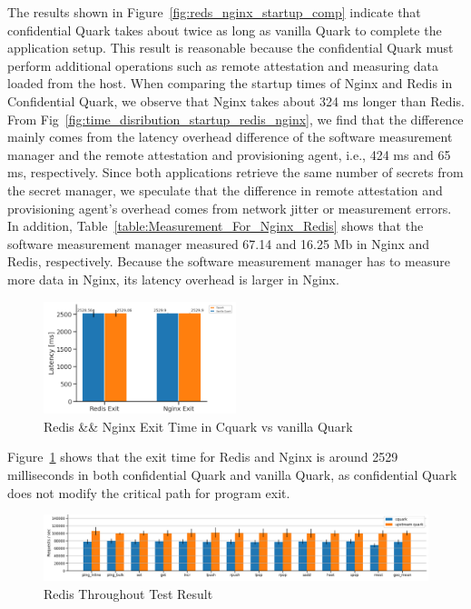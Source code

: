 The results shown in Figure~\ref{fig:reds_nginx_startup_comp} indicate that confidential Quark takes about twice as long as vanilla Quark to complete the application setup. This result is reasonable because the confidential Quark must perform additional operations such as remote attestation and 
measuring data loaded from the host. When comparing the startup times of Nginx and Redis in Confidential Quark, we observe that Nginx takes about 324 ms longer than Redis. From Fig~\ref{fig:time_disribution_startup_redis_nginx}, we find that the difference mainly comes from the latency overhead 
difference of the software measurement manager and the remote attestation and provisioning agent, i.e., 424 ms and 65 ms, respectively. Since both applications retrieve the same number of secrets from the secret manager, we speculate that the difference in remote attestation and provisioning 
agent's overhead comes from network jitter or measurement errors. In addition, Table~\ref{table:Measurement_For_Nginx_Redis} shows that the software measurement manager measured 67.14 and 16.25 Mb in Nginx and Redis, respectively. Because the software measurement manager has to measure more data in 
Nginx, its latency overhead is larger in Nginx. 

\begin{figure}[!htb]
  \centering
  \includegraphics[width=0.5\textwidth]{images/reds_nginx_exit_comp.PNG}
  \caption[Redis \&\& Nginx Exit Time in Cquark vs vanilla Quark]{Redis \&\& Nginx Exit Time in Cquark vs vanilla Quark}
  \label{fig:reds_nginx_exit_comp}
\end{figure}
Figure~\ref{fig:reds_nginx_exit_comp} shows that the exit time for Redis and Nginx is around 2529 milliseconds in both confidential Quark and vanilla Quark, as confidential Quark does not modify the critical path for program exit.
\begin{figure}[!htb]
  \centering
  \includegraphics[width=1\textwidth]{images/redis_throughput.PNG}
  \caption[Redis Throughout Test]{Redis Throughout Test Result}
  \label{fig:redis_throughput}
\end{figure}


